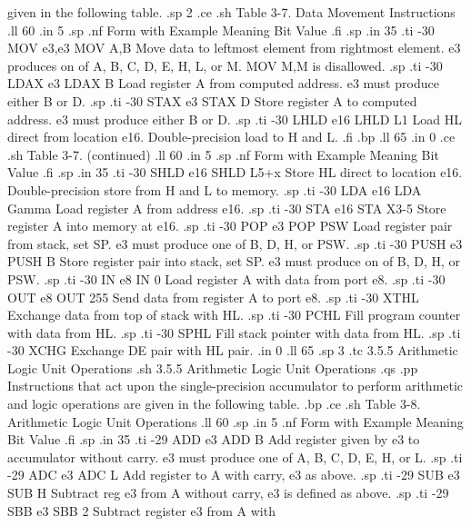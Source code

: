 given in the following table.
.sp 2
.ce
.sh
Table 3-7.  Data Movement Instructions
.ll 60
.in 5
.sp
.nf
Form with      Example                 Meaning
Bit Value
.fi
.sp
.in 35
.ti -30
MOV e3,e3      MOV A,B        Move data to leftmost element from rightmost
element.  e3 produces on of A, B, C, D, E, H, L, or M.  MOV M,M is
disallowed.
.sp
.ti -30
LDAX e3        LDAX B         Load register A from computed address.  e3 must
produce either B or D.
.sp
.ti -30
STAX e3        STAX D         Store register A to computed
address.  e3 must produce either B or D.
.sp
.ti -30
LHLD e16       LHLD L1        Load HL direct from location
e16.  Double-precision load to H and L.
.fi
.bp
.ll 65
.in 0
.ce
.sh
Table 3-7.  (continued)
.ll 60
.in 5
.sp
.nf
Form with      Example                 Meaning
Bit Value
.fi
.sp
.in 35
.ti -30
SHLD e16       SHLD L5+x      Store  HL  direct  to location e16.
Double-precision store from H and L to memory.
.sp
.ti -30
LDA e16        LDA Gamma      Load register A from address e16.
.sp
.ti -30
STA e16        STA X3-5       Store register A into memory
at e16.
.sp
.ti -30
POP e3         POP PSW        Load register pair from stack, set SP.
e3 must produce one of B, D, H, or PSW.
.sp
.ti -30
PUSH e3        PUSH B         Store register pair into stack, set SP.  e3
must produce on of B, D, H, or PSW.
.sp
.ti -30
IN e8          IN 0           Load register A with data from port 
e8.
.sp
.ti -30
OUT e8         OUT 255        Send data from register A to port 
e8.
.sp
.ti -30
XTHL                          Exchange data from top of stack 
with HL.
.sp
.ti -30
PCHL                          Fill program counter with data from 
HL.
.sp
.ti -30
SPHL                          Fill stack pointer with data from 
HL.
.sp
.ti -30
XCHG                          Exchange DE pair with HL pair.
.in 0
.ll 65
.sp 3
.tc         3.5.5  Arithmetic Logic Unit Operations
.sh
3.5.5  Arithmetic Logic Unit Operations
.qs
.pp
Instructions that act upon the single-precision accumulator to 
perform arithmetic and logic operations are given in the 
following table.
.bp
.ce
.sh
Table 3-8.  Arithmetic Logic Unit Operations
.ll 60
.sp
.in 5
.nf
Form with       Example                Meaning
Bit Value
.fi
.sp
.in 35
.ti -29
ADD e3         ADD B         Add register given by e3 to 
accumulator without carry.  e3 must produce one of A, B, C, D, E, 
H, or L.
.sp
.ti -29
ADC e3         ADC L         Add register to A with carry, e3 as 
above.
.sp
.ti -29
SUB e3         SUB H         Subtract reg e3 from A without 
carry, e3 is defined as above.
.sp
.ti -29
SBB e3         SBB 2         Subtract register e3 from A with 
